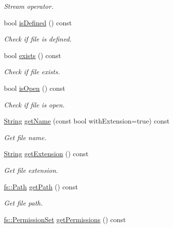 \begin{DoxyCompactItemize}
\begin{DoxyCompactList}\small\item\em Stream operator. \end{DoxyCompactList}\item 
bool \hyperlink{classlibrary_1_1core_1_1fs_1_1_file_a2044eecd956aaf55b4c55872485e1bf9}{is\+Defined} () const
\begin{DoxyCompactList}\small\item\em Check if file is defined. \end{DoxyCompactList}\item 
bool \hyperlink{classlibrary_1_1core_1_1fs_1_1_file_a61851886b6bf66cd0f179b6c7bd7f972}{exists} () const
\begin{DoxyCompactList}\small\item\em Check if file exists. \end{DoxyCompactList}\item 
bool \hyperlink{classlibrary_1_1core_1_1fs_1_1_file_a838cd36a7f54aaff75859b69cc9dac40}{is\+Open} () const
\begin{DoxyCompactList}\small\item\em Check if file is open. \end{DoxyCompactList}\item 
\hyperlink{classlibrary_1_1core_1_1types_1_1_string}{String} \hyperlink{classlibrary_1_1core_1_1fs_1_1_file_a118f4405fec3786d22937e6a77a0cecc}{get\+Name} (const bool with\+Extension=true) const
\begin{DoxyCompactList}\small\item\em Get file name. \end{DoxyCompactList}\item 
\hyperlink{classlibrary_1_1core_1_1types_1_1_string}{String} \hyperlink{classlibrary_1_1core_1_1fs_1_1_file_acfb85ab6934afc65ecf53a1a08775f84}{get\+Extension} () const
\begin{DoxyCompactList}\small\item\em Get file extension. \end{DoxyCompactList}\item 
\hyperlink{classlibrary_1_1core_1_1fs_1_1_path}{fs\+::\+Path} \hyperlink{classlibrary_1_1core_1_1fs_1_1_file_a70b1380ff844adf37a481bbdb46d11a0}{get\+Path} () const
\begin{DoxyCompactList}\small\item\em Get file path. \end{DoxyCompactList}\item 
\hyperlink{classlibrary_1_1core_1_1fs_1_1_permission_set}{fs\+::\+Permission\+Set} \hyperlink{classlibrary_1_1core_1_1fs_1_1_file_a0addf18f7510955e48fdef2416b98423}{get\+Permissions} () const

\end{DoxyCompactItemize}
